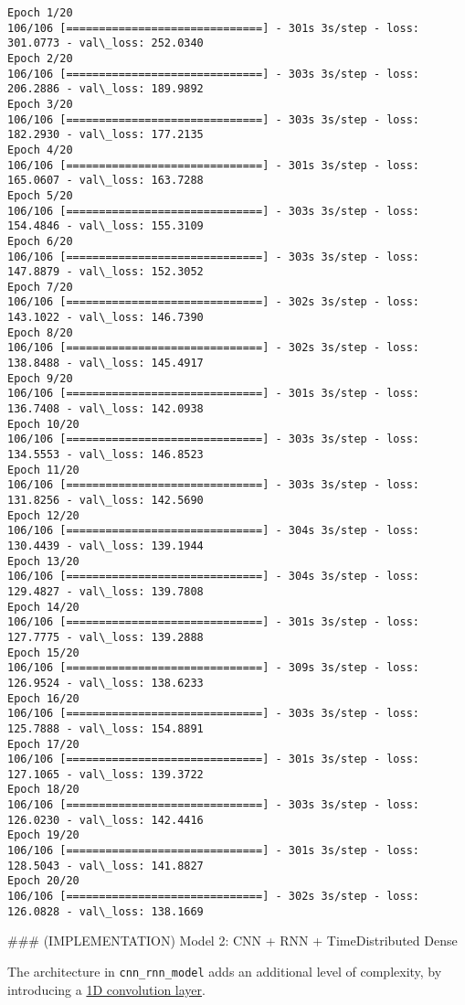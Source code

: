 \documentclass[11pt]{article}
\begin{document}
    \begin{Verbatim}[commandchars=\\\{\}]
Epoch 1/20
106/106 [==============================] - 301s 3s/step - loss: 301.0773 - val\_loss: 252.0340
Epoch 2/20
106/106 [==============================] - 303s 3s/step - loss: 206.2886 - val\_loss: 189.9892
Epoch 3/20
106/106 [==============================] - 303s 3s/step - loss: 182.2930 - val\_loss: 177.2135
Epoch 4/20
106/106 [==============================] - 301s 3s/step - loss: 165.0607 - val\_loss: 163.7288
Epoch 5/20
106/106 [==============================] - 303s 3s/step - loss: 154.4846 - val\_loss: 155.3109
Epoch 6/20
106/106 [==============================] - 303s 3s/step - loss: 147.8879 - val\_loss: 152.3052
Epoch 7/20
106/106 [==============================] - 302s 3s/step - loss: 143.1022 - val\_loss: 146.7390
Epoch 8/20
106/106 [==============================] - 302s 3s/step - loss: 138.8488 - val\_loss: 145.4917
Epoch 9/20
106/106 [==============================] - 301s 3s/step - loss: 136.7408 - val\_loss: 142.0938
Epoch 10/20
106/106 [==============================] - 303s 3s/step - loss: 134.5553 - val\_loss: 146.8523
Epoch 11/20
106/106 [==============================] - 303s 3s/step - loss: 131.8256 - val\_loss: 142.5690
Epoch 12/20
106/106 [==============================] - 304s 3s/step - loss: 130.4439 - val\_loss: 139.1944
Epoch 13/20
106/106 [==============================] - 304s 3s/step - loss: 129.4827 - val\_loss: 139.7808
Epoch 14/20
106/106 [==============================] - 301s 3s/step - loss: 127.7775 - val\_loss: 139.2888
Epoch 15/20
106/106 [==============================] - 309s 3s/step - loss: 126.9524 - val\_loss: 138.6233
Epoch 16/20
106/106 [==============================] - 303s 3s/step - loss: 125.7888 - val\_loss: 154.8891
Epoch 17/20
106/106 [==============================] - 301s 3s/step - loss: 127.1065 - val\_loss: 139.3722
Epoch 18/20
106/106 [==============================] - 303s 3s/step - loss: 126.0230 - val\_loss: 142.4416
Epoch 19/20
106/106 [==============================] - 301s 3s/step - loss: 128.5043 - val\_loss: 141.8827
Epoch 20/20
106/106 [==============================] - 302s 3s/step - loss: 126.0828 - val\_loss: 138.1669

    \end{Verbatim}

     \#\#\# (IMPLEMENTATION) Model 2: CNN + RNN + TimeDistributed Dense

The architecture in \texttt{cnn\_rnn\_model} adds an additional level of
complexity, by introducing a
\href{https://keras.io/layers/convolutional/\#conv1d}{1D convolution
layer}.
\end{document}
